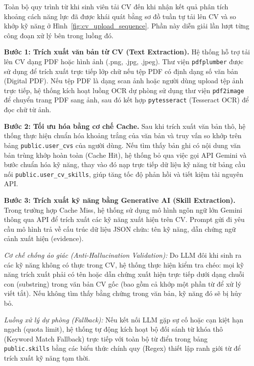 Toàn bộ quy trình từ khi sinh viên tải CV đến khi nhận kết quả phân tích khoảng cách năng lực đã được khái quát bằng sơ đồ tuần tự tải lên CV và so khớp kỹ năng ở Hình~\ref{fig:cv_upload_sequence}. Phần này diễn giải lần lượt từng công đoạn xử lý bên trong luồng đó.

\textbf{Bước 1: Trích xuất văn bản từ CV (Text Extraction).}
Hệ thống hỗ trợ tải lên CV dạng PDF hoặc hình ảnh (.png, .jpg, .jpeg). Thư viện \texttt{pdfplumber} được sử dụng để trích xuất trực tiếp lớp chữ nếu tệp PDF có định dạng số văn bản (Digital PDF). Nếu tệp PDF là dạng scan ảnh hoặc người dùng upload tệp ảnh trực tiếp, hệ thống kích hoạt luồng OCR dự phòng sử dụng thư viện \texttt{pdf2image} để chuyển trang PDF sang ảnh, sau đó kết hợp \texttt{pytesseract} (Tesseract OCR) để đọc chữ từ ảnh.

\textbf{Bước 2: Tối ưu hóa bằng cơ chế Cache.}
Sau khi trích xuất văn bản thô, hệ thống thực hiện chuẩn hóa khoảng trắng của văn bản và truy vấn so khớp trên bảng \texttt{public.user\_cvs} của người dùng. Nếu tìm thấy bản ghi có nội dung văn bản trùng khớp hoàn toàn (Cache Hit), hệ thống bỏ qua việc gọi API Gemini và bước chuẩn hóa kỹ năng, thay vào đó nạp trực tiếp dữ liệu kỹ năng từ bảng cầu nối \texttt{public.user\_cv\_skills}, giúp tăng tốc độ phản hồi và tiết kiệm tài nguyên API.

\textbf{Bước 3: Trích xuất kỹ năng bằng Generative AI (Skill Extraction).}
Trong trường hợp Cache Miss, hệ thống sử dụng mô hình ngôn ngữ lớn Gemini thông qua API để trích xuất các kỹ năng xuất hiện trên CV. Prompt gửi đi yêu cầu mô hình trả về cấu trúc dữ liệu JSON chứa: tên kỹ năng, dẫn chứng ngữ cảnh xuất hiện (evidence).

\textit{Cơ chế chống ảo giác (Anti-Hallucination Validation):} Do LLM đôi khi sinh ra các kỹ năng không có thực trong CV, hệ thống thực hiện kiểm tra chéo: mọi kỹ năng trích xuất phải có tên hoặc dẫn chứng xuất hiện trực tiếp dưới dạng chuỗi con (substring) trong văn bản CV gốc (bao gồm cả khớp một phần từ để xử lý viết tắt). Nếu không tìm thấy bằng chứng trong văn bản, kỹ năng đó sẽ bị hủy bỏ.

\textit{Luồng xử lý dự phòng (Fallback):} Nếu kết nối LLM gặp sự cố hoặc cạn kiệt hạn ngạch (quota limit), hệ thống tự động kích hoạt bộ đối sánh từ khóa thô (Keyword Match Fallback) trực tiếp với toàn bộ từ điển trong bảng \texttt{public.skills} bằng các biểu thức chính quy (Regex) thiết lập ranh giới từ để trích xuất kỹ năng tạm thời.


